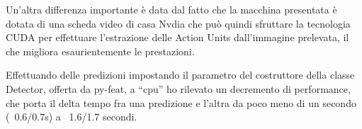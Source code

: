 Un’altra differenza importante è data dal fatto che la macchina presentata è dotata di una scheda video di casa Nvdia che può quindi sfruttare la tecnologia CUDA per effettuare l’estrazione delle Action Units dall’immagine prelevata, il che migliora esaurientemente le prestazioni.

Effettuando delle predizioni impostando il parametro del costruttore della classe Detector, offerta da py-feat, a “cpu” ho rilevato un decremento di performance, che porta il delta tempo fra una predizione e l’altra da poco meno di un secondo (~0.6/0.7s) a ~1.6/1.7 secondi.
